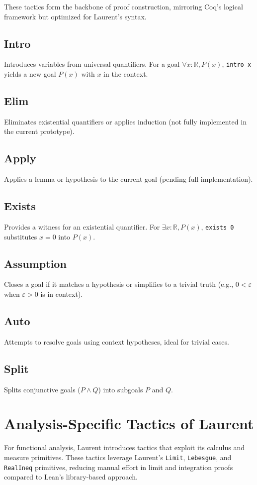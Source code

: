 \documentclass[12pt,twoside,draft]{cmpart}
\begin{document}
These tactics form the backbone of proof construction,
 mirroring Coq’s logical framework but optimized for Laurent’s syntax.

\subsection{Intro}
Introduces variables from universal quantifiers. For a goal $\forall x : \mathbb{R}, P(x)$, \texttt{intro x} yields a new goal $P(x)$ with $x$ in the context.

\subsection{Elim}
Eliminates existential quantifiers or applies induction (not fully implemented in the current prototype).

\subsection{Apply}
Applies a lemma or hypothesis to the current goal (pending full implementation).

\subsection{Exists}
Provides a witness for an existential quantifier. For $\exists x : \mathbb{R}, P(x)$, \texttt{exists 0} substitutes $x = 0$ into $P(x)$.

\subsection{Assumption}
Closes a goal if it matches a hypothesis or simplifies to a trivial truth (e.g., $0 < \varepsilon$ when $\varepsilon > 0$ is in context).

\subsection{Auto}
Attempts to resolve goals using context hypotheses, ideal for trivial cases.

\subsection{Split}
Splits conjunctive goals ($P \land Q$) into subgoals $P$ and $Q$.

\section{Analysis-Specific Tactics of Laurent}
For functional analysis, Laurent introduces tactics that exploit its calculus and measure primitives.
These tactics leverage Laurent’s \texttt{Limit}, \texttt{Lebesgue}, and \texttt{RealIneq} primitives,
reducing manual effort in limit and integration proofs compared to Lean’s library-based approach.
\end{document}

